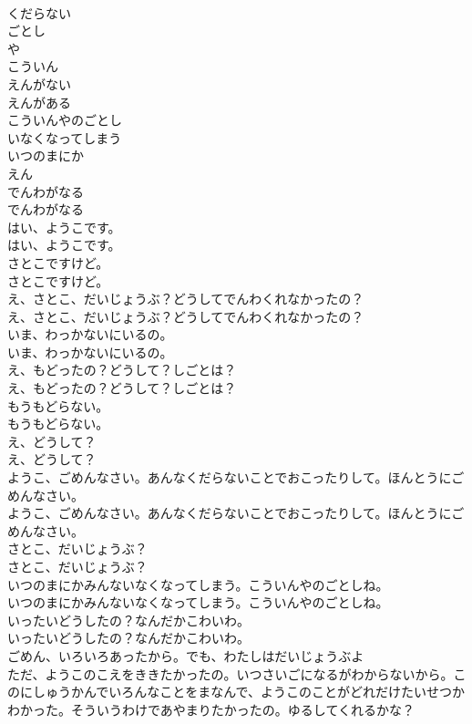 \documentclass[8pt]{extreport}
\begin{document}
\begin{CJK}{UTF8}{min}
\\	くだらない
\\	ごとし
\\	や
\\	こういん
\\	えんがない
\\	えんがある
\\	こういんやのごとし
\\	いなくなってしまう
\\	いつのまにか
\\	えん
\\	でんわがなる
\\	でんわがなる
\\	はい、ようこです。
\\	はい、ようこです。
\\	さとこですけど。
\\	さとこですけど。
\\	え、さとこ、だいじょうぶ？どうしてでんわくれなかったの？
\\	え、さとこ、だいじょうぶ？どうしてでんわくれなかったの？
\\	いま、わっかないにいるの。
\\	いま、わっかないにいるの。
\\	え、もどったの？どうして？しごとは？
\\	え、もどったの？どうして？しごとは？
\\	もうもどらない。
\\	もうもどらない。
\\	え、どうして？
\\	え、どうして？
\\	ようこ、ごめんなさい。あんなくだらないことでおこったりして。ほんとうにごめんなさい。
\\	ようこ、ごめんなさい。あんなくだらないことでおこったりして。ほんとうにごめんなさい。
\\	さとこ、だいじょうぶ？
\\	さとこ、だいじょうぶ？
\\	いつのまにかみんないなくなってしまう。こういんやのごとしね。
\\	いつのまにかみんないなくなってしまう。こういんやのごとしね。
\\	いったいどうしたの？なんだかこわいわ。
\\	いったいどうしたの？なんだかこわいわ。
\\	ごめん、いろいろあったから。でも、わたしはだいじょうぶよ
\\	ただ、ようこのこえをききたかったの。いつさいごになるがわからないから。このにしゅうかんでいろんなことをまなんで、ようこのことがどれだけたいせつかわかった。そういうわけであやまりたかったの。ゆるしてくれるかな？

\end{CJK}
\end{document}
